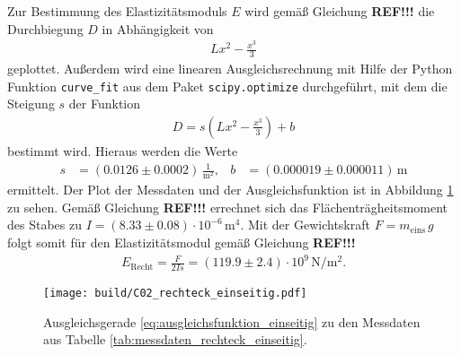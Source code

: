 \noindent
Zur Bestimmung des Elastizitätsmoduls $E$ wird gemäß Gleichung \textbf{REF!!!} die Durchbiegung $D$ in Abhängigkeit von 
\begin{align*}
    L x^2 - \frac{x^3}{3}
\end{align*}
geplottet.
Außerdem wird eine linearen Ausgleichsrechnung mit Hilfe der Python \cite[]{python} Funktion \texttt{curve\_fit} aus dem Paket
\texttt{scipy.optimize} \cite[]{scipy} durchgeführt, mit dem die Steigung $s$ der Funktion 
\begin{align}
    D = s \left(L x^2 - \frac{x^3}{3}\right) + b
    \label{eq:ausgleichsfunktion_einseitig}
\end{align}
bestimmt wird.
Hieraus werden die Werte 
\begin{align*}
    s &= (\num{0.0126} \pm \num{0.0002}) \, \frac{1}{\unit{\meter^2}}, & b &= (\num{0.000019} \pm \num{0.000011}) \, \unit{\meter}
\end{align*}
ermittelt.
Der Plot der Messdaten und der Ausgleichsfunktion ist in Abbildung \ref{fig:plot_rechteck_einseitig} zu sehen.
Gemäß Gleichung \textbf{REF!!!} errechnet sich das Flächenträgheitsmoment des Stabes zu 
$I = (\num{8.33} \pm \num{0.08}) \cdot 10^{-6} \, \unit{\meter^4}$.
Mit der Gewichtskraft $F = m_\text{eins} \, g$ folgt somit für den Elastizitätsmodul gemäß Gleichung \textbf{REF!!!}
\begin{align}
    E_\text{Recht} = \frac{F}{2 I s} = (\num{119.9} \pm \num{2.4}) \cdot 10^9 \, \unit{\newton\per\meter^2}.
\end{align}

\begin{figure}[H]
    \centering
    \texttt{[image: build/C02\_rechteck\_einseitig.pdf]}
    \caption{Ausgleichsgerade \eqref{eq:ausgleichsfunktion_einseitig} zu den Messdaten aus Tabelle \ref{tab:messdaten_rechteck_einseitig}.}
    \label{fig:plot_rechteck_einseitig}
\end{figure}